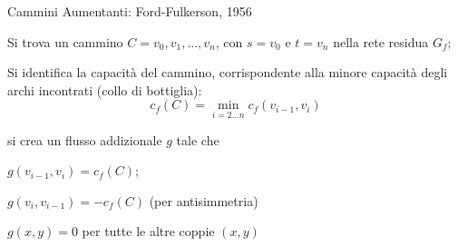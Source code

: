 \begin{frame}{Cammini Aumentanti: Ford-Fulkerson, 1956}

\vspace{-9pt}
\begin{overprint}
\BIL
\item Si trova un cammino $C=v_0,v_1,\ldots, v_n$, con $s=v_0$ e $t=v_n$ 
  nella rete residua $G_f$; 
\item Si identifica la \alert{capacità del cammino}, corrispondente
  alla minore capacità degli archi incontrati (\alert{collo di bottiglia}):
  \smallskip
  \[
    c_f(C) = \min_{i=2 \ldots n} c_f(v_{i-1},v_i)
  \]
\EIL
{}
\BIL
\item si crea un flusso addizionale $g$ tale che 
  \BI
  \item $g(v_{i-1}, v_i) = c_f(C)$;
  \item $g(v_i,v_{i-1}) = -c_f(C)$ (per antisimmetria)
  \item $g(x,y)=0$ per tutte le altre coppie $(x,y)$
  \EI
\EIL
\end{overprint}

\medskip
\begin{overprint}
\begin{center}
\end{center}
\begin{center}
\end{center}
\begin{center}
\end{center}
\begin{center}
\end{center}
\begin{center}
\end{center}
\end{overprint}



\end{frame}

